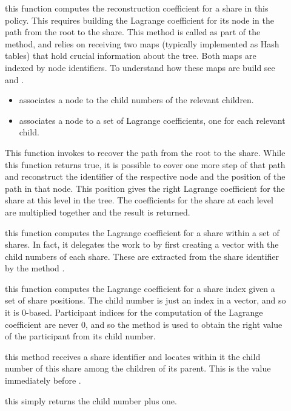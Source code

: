 \documentclass{article}
\begin{document}
\begin{description}
\item[] this function computes the reconstruction coefficient for a share in this policy. This requires building the Lagrange coefficient for its node in the path from the root to the share. This method is called as part of the  method, and relies on receiving two maps (typically implemented as Hash tables) that hold crucial information about the tree. Both maps are indexed by node identifiers. To understand how these maps are build see  and .
\begin{itemize}
\item {} associates a node to the child numbers of the relevant children. 
\item {} associates a node to a set of Lagrange coefficients, one for each relevant child.
\end{itemize}

This function invokes  to recover the path from the root to the share. While this function returns true, it is possible to cover one more step of that path and reconstruct the identifier of the respective node and the position of the path in that node. This position gives the right Lagrange coefficient for the share at this level in the tree. The coefficients for the share at each level are multiplied together and the result is returned.

\item[] this function computes the Lagrange coefficient for a share within a set of shares. In fact, it delegates the work to  by first creating a vector with the child numbers of each share. These are extracted from the share identifier by the method .

\item[] this function computes the Lagrange coefficient for a share index given a set of share positions. The child number is just an index in a vector, and so it is 0-based. Participant indices for the computation of the Lagrange coefficient are never $0$, and so the method  is used to obtain the right value of the participant from its child number. 

\item[] this method receives a share identifier and locates within it the child number of this share among the children of its parent. This is the value immediately before \code{:=}.
\item[] this simply returns the child number plus one.
\end{description}
\end{document}
